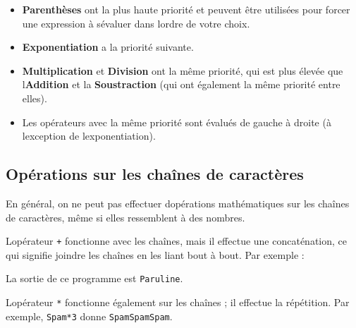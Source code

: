 \begin{itemize}
\tightlist
\item
  \textbf{Parenthèses} ont la plus haute priorité et peuvent être
  utilisées pour forcer une expression à s\textquotesingle évaluer dans
  l\textquotesingle ordre de votre choix.
\item
  \textbf{Exponentiation} a la priorité suivante.
\item
  \textbf{Multiplication} et \textbf{Division} ont la même priorité, qui
  est plus élevée que l\textquotesingle{}\textbf{Addition} et la
  \textbf{Soustraction} (qui ont également la même priorité entre
  elles).
\item
  Les opérateurs avec la même priorité sont évalués de gauche à droite
  (à l\textquotesingle exception de l\textquotesingle exponentiation).
\end{itemize}

\hypertarget{opuxe9rations-sur-les-chauxeenes-de-caractuxe8res}{%
\subsection{Opérations sur les chaînes de
caractères}\label{opuxe9rations-sur-les-chauxeenes-de-caractuxe8res}}

En général, on ne peut pas effectuer d\textquotesingle opérations
mathématiques sur les chaînes de caractères, même si elles ressemblent à
des nombres.

L\textquotesingle opérateur \texttt{+} fonctionne avec les chaînes, mais
il effectue une concaténation, ce qui signifie joindre les chaînes en
les liant bout à bout. Par exemple :

\begin{Shaded}
\begin{Highlighting}[]
\OperatorTok{=} 
\OperatorTok{=} 
\OperatorTok{+}
\end{Highlighting}
\end{Shaded}

La sortie de ce programme est \texttt{Paruline}.

L\textquotesingle opérateur \texttt{*} fonctionne également sur les
chaînes ; il effectue la répétition. Par exemple,
\texttt{\textquotesingle{}Spam\textquotesingle{}*3} donne
\texttt{\textquotesingle{}SpamSpamSpam\textquotesingle{}}.

